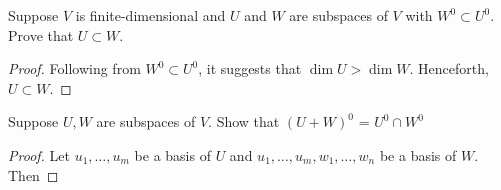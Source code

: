 \begin{exercise}
Suppose $V$ is finite-dimensional and $U$ and $W$ are subspaces of $V$ with $W^0 \subset U^{0}$. Prove that $U \subset W$.
\end{exercise}
\begin{proof}
	Following from $W^0 \subset U^{0}$, it suggests that $\operatorname{dim} U > \operatorname{dim} W$. Henceforth, $U \subset W$.
\end{proof}

\begin{exercise}
Suppose $U, W$ are subspaces of $V$. Show that $(U+W)^{0}$ = $U^{0} \cap W^{0}$
\end{exercise}
\begin{proof}
	Let $u_1, \ldots , u_m$ be a basis of $U$ and $u_1, \ldots ,u_m, w_1, \ldots ,w_n$ be a basis of $W$. Then
\end{proof}

